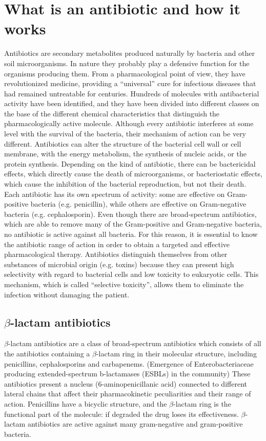 \documentclass[11pt]{report}
\begin{document}
\chapter{What is an antibiotic and how it works}
Antibiotics are secondary metabolites produced naturally by bacteria and other soil microorganisms. In nature they probably play a defensive function for the organisms producing them. From a pharmacological point of view, they have revolutionized medicine, providing a “universal” cure for infectious diseases that had remained untreatable for centuries. Hundreds of molecules with antibacterial activity have been identified, and they have been divided into different classes on the base of the different chemical characteristics that distinguish the pharmacologically active molecule. Although every antibiotic interferes at some level with the survival of the bacteria, their mechanism of action can be very different. Antibiotics can alter the structure of the bacterial cell wall or cell membrane, with the energy metabolism, the synthesis of nucleic acids, or the protein synthesis.
Depending on the kind of antibiotic, there can be bactericidal effects, which directly cause the death of microorganisms, or bacteriostatic effects, which cause the inhibition of the bacterial reproduction, but not their death.
Each antibiotic has its own spectrum of activity: some are effective on Gram-positive bacteria (e.g. penicillin), while others are effective on Gram-negative bacteria (e.g. cephalosporin). Even though there are broad-spectrum antibiotics, which are able to remove many of the Gram-positive and Gram-negative bacteria, no antibiotic is active against all bacteria. For this reason, it is essential to know the antibiotic range of action in order to obtain a targeted and effective pharmacological therapy.
Antibiotics distinguish themselves from other substances of microbial origin (e.g. toxins) because they can present high selectivity with regard to bacterial cells and low toxicity to eukaryotic cells. This mechanism, which is called “selective toxicity”, allows them to eliminate the infection without damaging the patient.

\section{$\beta$-lactam antibiotics}
$\beta$-lactam antibiotics are a class of broad-spectrum antibiotics which consists of all the antibiotics containing a $\beta$-lactam ring in their molecular structure, including penicillins, cephalosporins and carbapenems. (Emergence of Enterobacteriaceae producing extended-spectrum b-lactamases (ESBLs) in the community)
These antibiotics present a nucleus (6-aminopenicillanic acid) connected to different lateral chains that affect their pharmacokinetic peculiarities and their range of action.
Penicillins have a bicyclic structure, and the $\beta$-lactam ring is the functional part of the molecule: if degraded the drug loses its effectiveness.
$\beta$-lactam antibiotics are active against many gram-negative and gram-positive bacteria.
\end{document}
